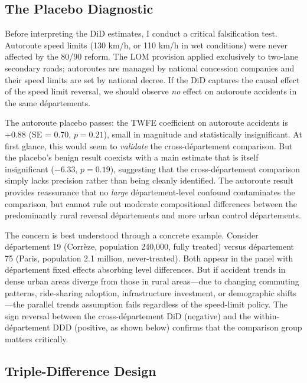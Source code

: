 \documentclass[12pt]{article}
\begin{document}
\subsection{The Placebo Diagnostic}

Before interpreting the DiD estimates, I conduct a critical falsification test. Autoroute speed limits (130 km/h, or 110 km/h in wet conditions) were never affected by the 80/90 reform. The LOM provision applied exclusively to two-lane secondary roads; autoroutes are managed by national concession companies and their speed limits are set by national decree. If the DiD captures the causal effect of the speed limit reversal, we should observe \textit{no} effect on autoroute accidents in the same d\'{e}partements.

The autoroute placebo passes: the TWFE coefficient on autoroute accidents is $+0.88$ (SE = 0.70, $p = 0.21$), small in magnitude and statistically insignificant. At first glance, this would seem to \textit{validate} the cross-d\'{e}partement comparison. But the placebo's benign result coexists with a main estimate that is itself insignificant ($-6.33$, $p = 0.19$), suggesting that the cross-d\'{e}partement comparison simply lacks precision rather than being cleanly identified. The autoroute result provides reassurance that no \textit{large} d\'{e}partement-level confound contaminates the comparison, but cannot rule out moderate compositional differences between the predominantly rural reversal d\'{e}partements and more urban control d\'{e}partements.

The concern is best understood through a concrete example. Consider d\'{e}partement 19 (Corr\`{e}ze, population 240,000, fully treated) versus d\'{e}partement 75 (Paris, population 2.1 million, never-treated). Both appear in the panel with d\'{e}partement fixed effects absorbing level differences. But if accident trends in dense urban areas diverge from those in rural areas---due to changing commuting patterns, ride-sharing adoption, infrastructure investment, or demographic shifts---the parallel trends assumption fails regardless of the speed-limit policy. The sign reversal between the cross-d\'{e}partement DiD (negative) and the within-d\'{e}partement DDD (positive, as shown below) confirms that the comparison group matters critically.

\subsection{Triple-Difference Design}
\end{document}
